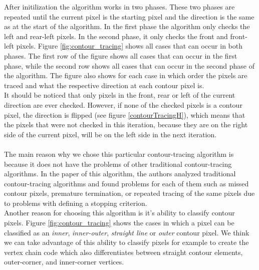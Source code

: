 \documentclass[thesis.tex]{subfiles}
\begin{document}
After initilization the algorithm works in two phases. These two phases are repeated until the current pixel is the starting pixel and the direction is the same as at the start of the algorithm. In the first phase the algorithm only checks the left and rear-left pixels. In the second phase, it only checks the front and front-left pixels. Figure \ref{fig:contour_tracing} shows all cases that can occur in both phases. The first row of the figure shows all cases that can occur in the first phase, while the second row shows all cases that can occur in the second phase of the algorithm. The figure also shows for each case in which order the pixels are traced and what the respective direction at each contour pixel is. \\
It should be noticed that only pixels in the front, rear or left of the current direction are ever checked. However, if none of the checked pixels is a contour pixel, the direction is flipped (see figure \ref{contourTracingH}), which means that the pixels that were not checked in this iteration, because they are on the right side of the current pixel, will be on the left side in the next iteration.  \\ \\
The main reason why we chose this particular contour-tracing algorithm is because it does not have the problems of other traditional contour-tracing algorithms. In the paper of this algorithm, the authors analyzed traditional contour-tracing algorithms and found problems for each of them such as missed contour pixels, premature termination, or repeated tracing of the same pixels due to problems with defining a stopping criterion. \\
Another reason for choosing this algorithm is it's ability to classify contour pixels. Figure \ref{fig:contour_tracing} shows the cases in which a pixel can be classified as an \textit{inner}, \textit{inner-outer}, \textit{straight line} or \textit{outer} contour pixel. We think we can take advantage of this ability to classify pixels for example to create the vertex chain code which also differentiates between straight contour elements, outer-corner, and  inner-corner vertices.

\usetikzlibrary{arrows.meta}
\newcommand{\figcontourwidth}{3.5}
\newcommand{\figcontourfirstOffset}{0}
\newcommand{\figcontousecondOffset}{4.5}
\newcommand{\figcontouthirdOffset}{9}
\newcommand{\figcontoufourthOffset}{13.5}
\newcommand{\figcontousecondRowYOffset}{4.5}	
\end{document}
